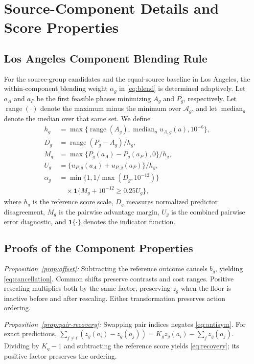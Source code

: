 \documentclass[letterpaper,journal]{IEEEtran}
\newcommand{\ind}{\mathbf{1}}
\DeclareMathOperator{\range}{range}
\DeclareMathOperator{\median}{median}
\begin{document}
\appendices
\section{Source-Component Details and Score Properties}
\label{app:score-proofs}

\subsection{Los Angeles Component Blending Rule}
For the source-group candidates and the equal-source baseline in Los Angeles, the within-component blending weight $\alpha_g$ in \eqref{eq:blend} is determined adaptively. Let $a_A$ and $a_P$ be the first feasible phases minimizing $A_g$ and $P_g$, respectively. Let $\range(\cdot)$ denote the maximum minus the minimum over $\mathcal A_g$, and let $\median_a$ denote the median over that same set. We define
\begin{align}
 h_g&=\max\{\range(A_g),\median_a u_{A,g}(a),10^{-6}\},\nonumber\\
 D_g&=\range(P_g-A_g)/h_g,\nonumber\\
 M_g&=\max\{P_g(a_A)-P_g(a_P),0\}/h_g,\nonumber\\
 U_g&=\{u_{P,g}(a_A)+u_{P,g}(a_P)\}/h_g,\nonumber\\
 \alpha_g&=\min\{1,1/\max(D_g,10^{-12})\}\nonumber\\
 &\quad{}\times\ind\{M_g+10^{-12}\geq0.25U_g\},
 \label{eq:la-component-blend}
\end{align}
where $h_g$ is the reference score scale, $D_g$ measures normalized predictor disagreement, $M_g$ is the pairwise advantage margin, $U_g$ is the combined pairwise error diagnostic, and $\ind\{\cdot\}$ denotes the indicator function.

\subsection{Proofs of the Component Properties}
\emph{Proposition~\ref{prop:offset}:} Subtracting the reference outcome cancels $b_g$, yielding \eqref{eq:cancellation}. Common shifts preserve contrasts and cost ranges. Positive rescaling multiplies both by the same factor, preserving $z_g$ when the floor is inactive before and after rescaling. Either transformation preserves action ordering.

\emph{Proposition~\ref{prop:pair-recovery}:} Swapping pair indices negates \eqref{eq:antisym}. For exact predictions, $\sum_{j\ne i}(z_g(a_i)-z_g(a_j))=K_gz_g(a_i)-\sum_jz_g(a_j)$. Dividing by $K_g-1$ and subtracting the reference score yields \eqref{eq:recovery}; its positive factor preserves the ordering.
\end{document}
